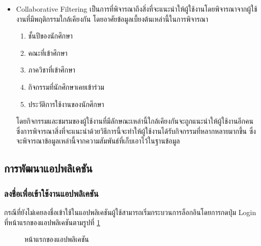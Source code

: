 \documentclass[14pt,oneside,openright,a4paper]{cpe-thai-project}
\begin{document}
\begin{itemize}
    \item Collaborative Filtering เป็นการที่พิจารณาถึงสิ่งที่จะแนะนำให้ผู้ใช้งานโดยพิจารณาจากผู้ใช้งานที่มีพฤติกรรมใกล้เคียงกัน โดยอาศัยข้อมูลเบี้ยงต้นเหล่านี้ในการพิจารณา
      \begin{enumerate}
        \item ชั้นปีของนักศึกษา
        \item คณะที่เข้าศึกษา
        \item ภาควิชาที่เข้าศึกษา
        \item กิจกรรมที่นักศึกษาเคยเข้าร่วม
        \item ประวัติการใช้งานของนักศึกษา
      \end{enumerate}
      โดยกิจกรรมและชมรมของผู้ใช้งานที่มีลักษณะเหล่านี้ใกล้เคียงกันจะถูกแนะนำให้ผู้ใช้งานอีกคน ซึ่งการพิจารณาสิ่งที่จะแนะนำด้วยวิธีการนี้จะทำให้ผู้ใช้งานได้รับกิจกรรมที่หลากหลายมากขึ้น ซึ่งจะพิจารณาข้อมูลเหล่านี้จากความสัมพันธ์ที่เก็บเอาไว้ในฐานข้อมูล
    \end{itemize}
  
    \subsection{การพัฒนาแอปพลิเคชัน} 

  \subsubsection{ลงชื่อเพื่อเข้าใช้งานแอปพลิเคชัน} 
  กรณีที่ยังไม่เคยลงชื่อเข้าใช้ในแอปพลิเคชันผู้ใช้สามารถเริ่มกระบวนการล็อกอินโดยการกดปุ่ม Login ที่หน้าแรกของแอปพลิเคชันตามรูปที่ \ref{fig:1}
  
  \begin{figure}[H]\centering
    \setlength{\fboxrule}{0.5mm} 
    \setlength{\fboxsep}{0.5cm}
    \caption{หน้าแรกของแอปพลิเคชัน}\label{fig:1}
   \end{figure}
\end{document}
